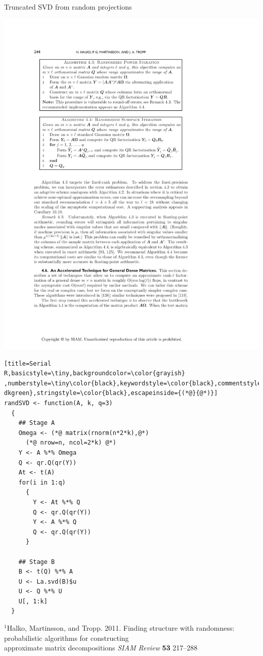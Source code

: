 \begin{frame}[fragile]
\begin{block}{Truncated SVD from random projections\footnotemark}
\begin{minipage}{.56\textwidth}
\begin{center}
      \includegraphics[height=.26\textheight]{../common/pics/randsvd/randSVDalg4_4}
    \end{center}
  \end{minipage}
  \begin{minipage}{0.43\textwidth}
\begin{lstlisting}[title=Serial
R,basicstyle=\tiny,backgroundcolor=\color{grayish}
,numberstyle=\tiny\color{black},keywordstyle=\color{black},commentstyle=\color{
dkgreen},stringstyle=\color{black},escapeinside={(*@}{@*)}]
randSVD <- function(A, k, q=3)
  {
    ## Stage A
    Omega <- (*@ matrix(rnorm(n*2*k),@*)
      (*@ nrow=n, ncol=2*k) @*)
    Y <- A %*% Omega
    Q <- qr.Q(qr(Y))
    At <- t(A)
    for(i in 1:q)
      {
        Y <- At %*% Q
        Q <- qr.Q(qr(Y))
        Y <- A %*% Q
        Q <- qr.Q(qr(Y))
      }

    ## Stage B
    B <- t(Q) %*% A
    U <- La.svd(B)$u
    U <- Q %*% U
    U[, 1:k]
  }
\end{lstlisting} %
\end{minipage}
{\fontsize{6pt}{10}\selectfont $^1$Halko, Martinsson,
  and Tropp. 2011. Finding structure with randomness: probabilistic
  algorithms  for constructing \\[-1ex] approximate matrix decompositions
  \emph{SIAM Review} \textbf{53} 217--288}
\end{block}
\end{frame}


